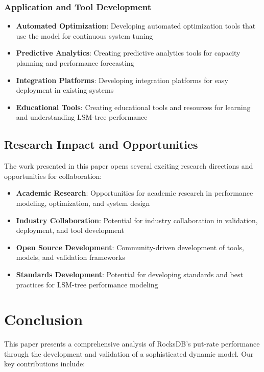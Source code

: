\documentclass[11pt]{article}
\begin{document}
\subsubsection{Application and Tool Development}
\begin{itemize}
    \item \textbf{Automated Optimization}: Developing automated optimization tools that use the model for continuous system tuning
    \item \textbf{Predictive Analytics}: Creating predictive analytics tools for capacity planning and performance forecasting
    \item \textbf{Integration Platforms}: Developing integration platforms for easy deployment in existing systems
    \item \textbf{Educational Tools}: Creating educational tools and resources for learning and understanding LSM-tree performance
\end{itemize}

\subsection{Research Impact and Opportunities}

The work presented in this paper opens several exciting research directions and opportunities for collaboration:

\begin{itemize}
    \item \textbf{Academic Research}: Opportunities for academic research in performance modeling, optimization, and system design
    \item \textbf{Industry Collaboration}: Potential for industry collaboration in validation, deployment, and tool development
    \item \textbf{Open Source Development}: Community-driven development of tools, models, and validation frameworks
    \item \textbf{Standards Development}: Potential for developing standards and best practices for LSM-tree performance modeling
\end{itemize}

\section{Conclusion}
\label{sec:conclusion}

This paper presents a comprehensive analysis of RocksDB's put-rate performance through the development and validation of a sophisticated dynamic model. Our key contributions include:
\end{document}
